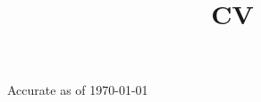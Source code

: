 \documentclass[11pt,letterpaper,roman]{moderncv}
\title{CV}
\begin{document}
\renewcommand*{\bibliographyhead}[1]{}

\makecvtitle


\hfill Accurate as of \today








%



%


%
\end{document}
